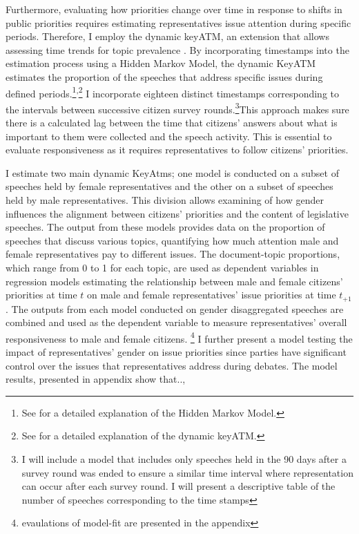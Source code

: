 Furthermore, evaluating how priorities change over time in response to shifts in public priorities requires estimating representatives issue attention during specific periods. Therefore, I employ the dynamic keyATM, an extension that allows assessing time trends for topic prevalence \parencite{eshima_keyword_2023}. By incorporating timestamps into the estimation process using a Hidden Markov Model, the dynamic KeyATM estimates the proportion of the speeches that address specific issues during defined periods.\footnote{See \textcite{chib_estimation_1998} for a detailed explanation of the Hidden Markov Model.}\textsuperscript{,}\footnote{See \textcite{eshima_keyword_2023} for a detailed explanation of the dynamic keyATM.} I incorporate eighteen distinct timestamps corresponding to the intervals between successive citizen survey rounds.\footnote{ I will include a model that includes only speeches held in the 90 days after a survey round was ended to ensure a similar time interval where representation can occur after each survey round. I will present a descriptive table of the number of speeches corresponding to the time stamps}This approach makes sure there is a calculated lag between the time that citizens' answers about what is important to them were collected and the speech activity. This is essential to evaluate responsiveness as it requires representatives to follow citizens' priorities. 

I estimate two main dynamic KeyAtms; one model is conducted on a subset of speeches held by female representatives and the other on a subset of speeches held by male representatives. This division allows examining of how gender influences the alignment between citizens' priorities and the content of legislative speeches. The output from these models provides data on the proportion of speeches that discuss various topics, quantifying how much attention male and female representatives pay to different issues.
The document-topic proportions, which range from 0 to 1 for each topic, are used as dependent variables in regression models estimating the relationship between male and female citizens' priorities at time $t$ on male and female representatives' issue priorities at time $t_{+1}$. The outputs from each model conducted on gender disaggregated speeches are combined and used as the dependent variable to measure representatives' overall responsiveness to male and female citizens. \footnote{evaulations of model-fit are presented in the appendix} I further present a model testing the impact of representatives’ gender on issue priorities since parties have significant control over the issues that representatives address during debates.  \color{red}The model results, presented in appendix show that.., \color{black}

